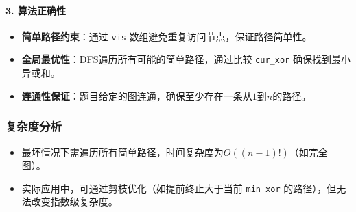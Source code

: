 \documentclass[../mainReport.tex]{subfiles}
\begin{document}
\paragraph{3. 算法正确性}
\begin{itemize}
    \item \textbf{简单路径约束}：通过 \texttt{vis} 数组避免重复访问节点，保证路径简单性。
    \item \textbf{全局最优性}：DFS遍历所有可能的简单路径，通过比较 \texttt{cur\_xor} 确保找到最小异或和。
    \item \textbf{连通性保证}：题目给定的图连通，确保至少存在一条从$1$到$n$的路径。
\end{itemize}

\subsubsection{复杂度分析}
\begin{itemize}
    \item 最坏情况下需遍历所有简单路径，时间复杂度为$O((n-1)!)$（如完全图）。
    \item 实际应用中，可通过剪枝优化（如提前终止大于当前 \texttt{min\_xor} 的路径），但无法改变指数级复杂度。
\end{itemize}



    
    
\end{document}

